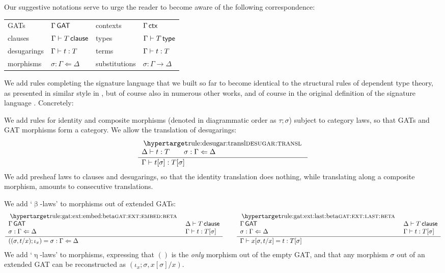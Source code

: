 \documentclass[a4paper]{article}
\begin{document}
Our suggestive notations serve to urge the reader to become aware of the following correspondence:
\begin{center}
	\begin{tabular}{l l | l l}
		& \text{GAT signature language} && \text{type theory} \\ \hline
		GATs & $\Gamma \,\mathsf{GAT}$ & contexts & $\Gamma \,\mathsf{ctx}$ \\
		clauses & $\Gamma \vdash T \,\mathsf{clause}$ & types & $\Gamma \vdash T \,\mathsf{type}$ \\
		desugarings & $\Gamma \vdash t : T$ & terms & $\Gamma \vdash t : T$ \\
		morphisms & $\sigma : \Gamma \Leftarrow \Delta$ & substitutions & $\sigma : \Gamma \to \Delta$
	\end{tabular}
\end{center}

We add rules completing the signature language that we built so far to become identical to the structural rules of dependent type theory, as presented in similar style in \cite[\S 3.2.1-3.2.2]{nuyts-phd}, but of course also in numerous other works, and of course in the original definition of the signature language \cite{constructing-qiits}. Concretely:

We add rules for identity and composite morphisms (denoted in diagrammatic order as $\tau ; \sigma$) subject to category laws, so that GATs and GAT morphisms form a category.
We allow the translation of desugarings:
\[
	\inferencel{desugar:transl}{
		\Delta \sez t : T \qquad
		\sigma : \Gamma \Leftarrow \Delta
	}{
		\Gamma \sez t[\sigma] : T[\sigma]
	}{}
\]
We add presheaf laws to clauses and desugarings, so that the identity translation does nothing, while translating along a composite morphism, amounts to consecutive translations.

We add `$\upbeta$-laws' to morphisms out of extended GATs:
\[
	\inferencel{gat:ext:embed:beta}{
		\Gamma \GAT &
		\Delta \sez T \clause \\
		\sigma : \Gamma \Leftarrow \Delta &
		\Gamma \sez t : T[\sigma]
	}{
		((\sigma, t/x) ; \iota_x) = \sigma : \Gamma \Leftarrow \Delta
	}{}
	\qquad
	\inferencel{gat:ext:last:beta}{
		\Gamma \GAT &
		\Delta \sez T \clause \\
		\sigma : \Gamma \Leftarrow \Delta &
		\Gamma \sez t : T[\sigma]
	}{
		\Gamma \sez x[\sigma, t/x] = t : T[\sigma]
	}{}
\]
We add `$\upeta$-laws' to morphisms, expressing that $()$ is the \emph{only} morphism out of the empty GAT, and that any morphism $\sigma$ out of an extended GAT can be reconstructed as $(\iota_x ; \sigma, x[\sigma]/x)$.
\end{document}

